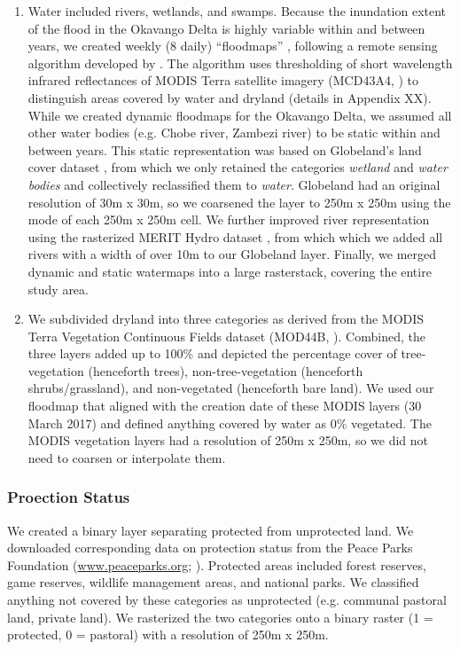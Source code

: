 \documentclass[abstract=on,10pt,a4paper,bibliography=totocnumbered]{article}
\begin{document}
\begin{enumerate}[label = (\arabic*)]

  \item Water included rivers, wetlands, and swamps. Because the
  inundation extent of the flood in the Okavango Delta is highly variable within
  and between years, we created weekly (8 daily)  ``floodmaps'' , following a
  remote sensing algorithm developed by \citep{Wolski.2017}. The algorithm uses
  thresholding of short wavelength infrared reflectances of MODIS Terra
  satellite imagery (MCD43A4, \citealp{Schaaf.2015}) to distinguish areas
  covered by water and dryland (details in Appendix XX). While we created
  dynamic floodmaps for the Okavango Delta, we assumed all other water bodies
  (e.g. Chobe river, Zambezi river) to be static within and between years. This
  static representation was based on Globeland's land cover dataset
  \citep{Chen.2015}, from which we only retained the categories \textit{wetland}
  and \textit{water bodies} and collectively reclassified them to
  \textit{water}. Globeland had an original resolution of 30m x 30m, so we
  coarsened the layer to 250m x 250m using the mode of each 250m x 250m cell. We
  further improved river representation using the rasterized MERIT Hydro dataset
  \citep{Yamazaki.2019}, from which which we added all rivers with a width of
  over 10m to our Globeland layer. Finally, we merged dynamic and static
  watermaps into a large rasterstack, covering the entire study area.

  \item We subdivided dryland into three categories as derived from the
  MODIS Terra Vegetation Continuous Fields dataset (MOD44B,
  \citealp{Dimiceli.2015}). Combined, the three layers added up to 100\% and
  depicted the percentage cover of tree-vegetation (henceforth trees),
  non-tree-vegetation (henceforth shrubs/grassland), and non-vegetated
  (henceforth bare land).  We used our floodmap that aligned with the creation
  date of these MODIS layers (30 March 2017) and defined anything covered by
  water as 0\% vegetated. The MODIS vegetation layers had a resolution of 250m x
  250m, so we did not need to coarsen or interpolate them.

\end{enumerate}

\subsubsection{Proection Status}
We created a binary layer separating protected from unprotected land. We
downloaded corresponding data on protection status from the Peace Parks
Foundation (\url{www.peaceparks.org}; \citealp{PeaceParks.2019}). Protected
areas included forest reserves, game reserves, wildlife management areas, and
national parks. We classified anything not covered by these categories as
unprotected (e.g. communal pastoral land, private land). We rasterized the two
categories onto a binary raster (1 = protected, 0 = pastoral) with a resolution
of 250m x 250m.
\end{document}
